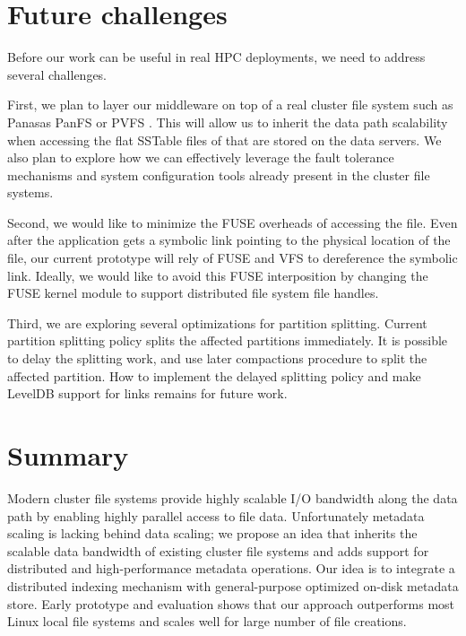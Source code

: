 \section{Future challenges}
\label{futurework}

Before our work can be useful in real HPC deployments, we need to address
several challenges.

First, we plan to layer our middleware on top of a real cluster file system
such as Panasas PanFS \citep{panfs:welch08} or PVFS \citep{pvfs:www}. This will
allow us to inherit the data path scalability when accessing the flat SSTable
files of \ldb that are stored on the data servers. We also plan to explore how
we can effectively leverage the fault tolerance mechanisms and system
configuration tools already present in the cluster file systems.

Second, we would like to minimize the FUSE overheads of accessing the file.
Even after the application gets a symbolic link pointing to the physical
location of the file, our current prototype will rely of FUSE and VFS to
dereference the symbolic link. Ideally, we would like to avoid this FUSE
interposition by changing the FUSE kernel module to support distributed file
system file handles. 

Third, we are exploring several optimizations for partition splitting.
Current partition splitting policy splits the affected partitions immediately.
It is possible to delay the splitting work, and use later compactions procedure
to split the affected partition. How to implement the delayed splitting policy
and make LevelDB support for links remains for future work. 

\section{Summary}
\label{summary}

Modern cluster file systems provide highly scalable I/O bandwidth along the
data path by enabling highly parallel access to file data.
Unfortunately metadata scaling is lacking behind data scaling; we propose an
idea that inherits the scalable data bandwidth of existing cluster file systems
and adds support for distributed and high-performance metadata operations.
Our idea is to integrate a distributed indexing mechanism with general-purpose
optimized on-disk metadata store.
Early prototype and evaluation shows that our approach outperforms most Linux
local file systems and scales well for large number of file creations. 




